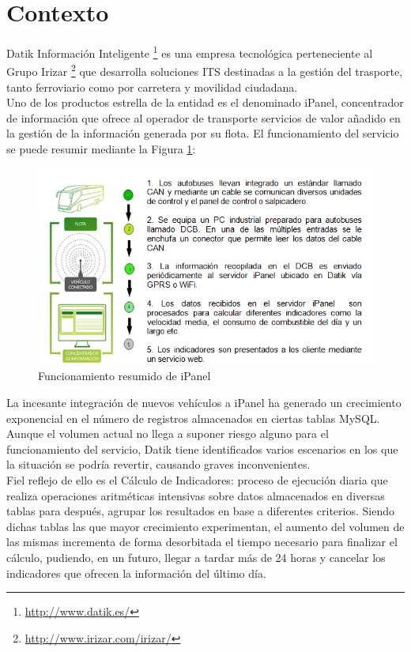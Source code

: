 \section{Contexto}
 
Datik Información Inteligente \footnote{\url{http://www.datik.es/}} es una empresa tecnológica perteneciente al Grupo Irizar \footnote{\url{http://www.irizar.com/irizar/}} que desarrolla soluciones ITS destinadas a la gestión del trasporte, tanto ferroviario como por carretera y movilidad ciudadana.\\

Uno de los productos estrella de la entidad es el denominado iPanel, concentrador de  información que ofrece al operador de transporte servicios de valor añadido en la gestión de la información generada por su flota. El funcionamiento del servicio se puede resumir mediante la Figura \ref{fig:ipanel}:\\

\begin{figure}[h]
	\centering
	\includegraphics[width=1\textwidth]{Ilustraciones/ipanel_infraesctructure.png}
	\caption{Funcionamiento resumido de iPanel}
	\label{fig:ipanel}
\end{figure}

La incesante integración de nuevos vehículos a iPanel ha generado un crecimiento exponencial en el número de registros almacenados en ciertas tablas MySQL. Aunque el volumen actual no llega a suponer riesgo alguno para el funcionamiento del servicio, Datik tiene identificados varios escenarios en los que la situación se podría revertir, causando graves inconvenientes.\\

Fiel reflejo de ello es el Cálculo de Indicadores: proceso de ejecución diaria que realiza operaciones aritméticas intensivas sobre datos almacenados en diversas tablas para después, agrupar los resultados en base a diferentes criterios. Siendo dichas tablas las que mayor crecimiento experimentan, el aumento del volumen de las mismas incrementa de forma desorbitada el tiempo necesario para finalizar el cálculo, pudiendo, en un futuro, llegar a tardar más de 24 horas y cancelar los indicadores que ofrecen la información del último día.\\

